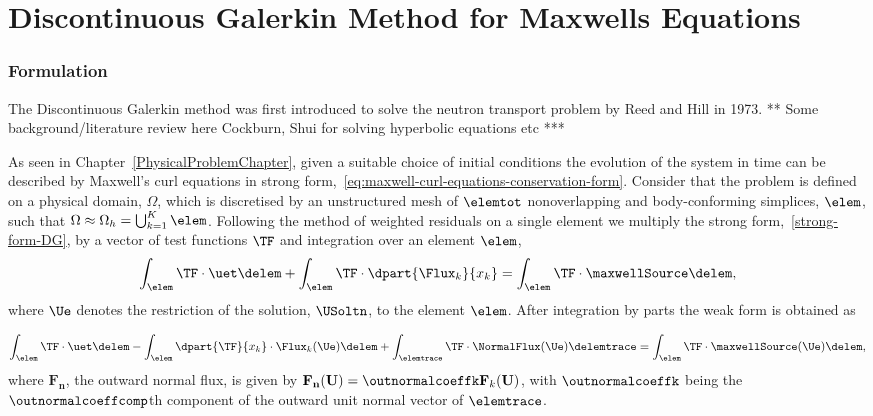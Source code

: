 \chapter{Discontinuous Galerkin Method for Maxwells Equations} %
\label{Chapter3}

\subsection{Formulation}

The Discontinuous Galerkin method was first introduced to solve the neutron transport problem by Reed and Hill \cite{} in 1973.
** Some background/literature review here Cockburn, Shui for solving hyperbolic equations etc ***

As seen in Chapter~\ref{PhysicalProblemChapter}, given a suitable choice of initial conditions the evolution of the system in time can be described by Maxwell's curl equations in strong form,~\eqref{eq:maxwell-curl-equations-conservation-form}. Consider that the problem is defined on a physical domain, $\Omega$, which is discretised by an unstructured mesh of $\elemtot$ nonoverlapping and body-conforming simplices, $\elem$, such that $ \Omega \approx \Omega_h = \mathop{\bigcup}_{k=1}^{K} \elem $.
Following the method of weighted residuals on a single element we multiply the strong form,~\eqref{strong-form-DG}, by a vector of test functions $\TF$ and integration over an element $\elem$,
$$
\int_{\elem} \TF \cdot \uet \delem  + \int_{\elem} \TF \cdot \dpart{\Flux_{k}}{x_{k}}= \int_{\elem} \TF \cdot \maxwellSource \delem,
$$
where $\Ue$ denotes the restriction of the solution, $\USoltn$, to the element $\elem$. After integration by parts the weak form is obtained as

\begin{equation}
\int_{\elem} \TF \cdot \uet \delem  - \int_{\elem} \dpart{\TF}{x_k} \cdot
\Flux_{k}(\Ue) \delem + \int_{\elemtrace} \TF \cdot \NormalFlux(\Ue) \delemtrace
= \int_{\elem} \TF \cdot \maxwellSource(\Ue) \delem,
\label{eq:weak-form-with-physical-flux}
\end{equation}
where $\mathbf{F_n}$, the outward normal flux, is given by $ \mathbf{F_n}(\mathbf{U}) = \outnormalcoeffk \mathbf{F}_k(\mathbf{U}) $, with $\outnormalcoeffk$ being the $\outnormalcoeffcomp$th component of the outward unit normal vector of $\elemtrace$.


